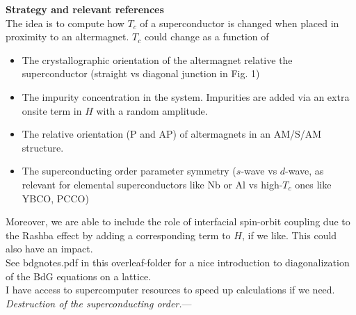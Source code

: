 \documentclass[aps,twocolumn,amsmath,amssymb,preprintnumbers,floatfix,prl,superscriptaddress,longbibliography]{revtex4-2}%
\newcommand{\ve}[1]{\boldsymbol{#1}}
\newcommand{\vk}{{\ve{k}}} %
\newcommand{\hans}[1]{\textcolor{Magenta}{{#1}}}
\newcommand{\jacob}[1]{\textcolor{Red}{{#1}}}
\begin{document}
\noindent \textbf{Strategy and relevant references}\\
The idea is to compute how $T_c$ of a superconductor is changed when placed in proximity to an altermagnet. $T_c$ could change as a function of
\begin{itemize}
    \item The crystallographic orientation of the altermagnet relative the superconductor (straight vs diagonal junction in Fig. 1)
    \item The impurity concentration in the system. Impurities are added via an extra onsite term in $H$ with a random amplitude.
    \item The relative orientation (P and AP) of altermagnets in an AM/S/AM structure. 
    \item The superconducting order parameter symmetry ($s$-wave vs $d$-wave, as relevant for elemental superconductors like Nb or Al vs high-$T_c$ ones like YBCO, PCCO)
\end{itemize}
Moreover, we are able to include the role of interfacial spin-orbit coupling due to the Rashba effect by adding a corresponding term to $H$, if we like. This could also have an impact. 
\text{ }\\

See bdgnotes.pdf in this overleaf-folder for a nice introduction to diagonalization of the BdG equations on a lattice. 
\text{ }\\

I have access to supercomputer resources to speed up calculations if we need. 
\text{ }\\

\textit{Destruction of the superconducting order.}---

\end{document}
